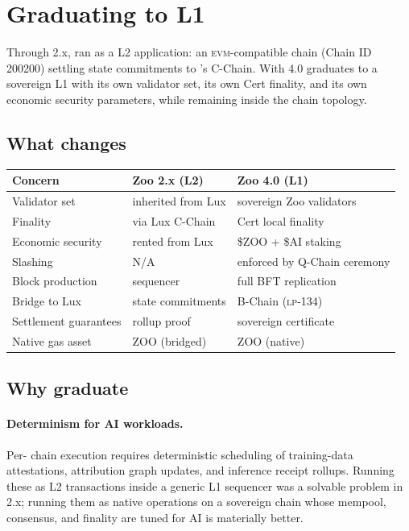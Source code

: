 \section{Graduating to L1}
\label{sec:l1-graduation}

Through 2.x, \Zoo{} ran as a \Lux{} L2 application: an \textsc{evm}-compatible
chain (Chain ID 200200) settling state commitments to \Lux{}'s C-Chain. With
4.0 \Zoo{} graduates to a sovereign L1 with its own validator set, its own
\Quasar{}Cert finality, and its own economic security parameters, while
remaining inside the \Lux{} chain topology.

\subsection{What changes}

\begin{longtable}{p{}p{}p{}}
\toprule
\textbf{Concern} & \textbf{Zoo 2.x (L2)} & \textbf{Zoo 4.0 (L1)} \\
\midrule
Validator set & inherited from Lux & sovereign Zoo validators \\
Finality & via Lux C-Chain & \Quasar{}Cert local finality \\
Economic security & rented from Lux & \$ZOO + \$AI staking \\
Slashing & N/A & enforced by Q-Chain ceremony \\
Block production & sequencer & full BFT replication \\
Bridge to Lux & state commitments & B-Chain (\textsc{lp-134}) \\
Settlement guarantees & rollup proof & sovereign certificate \\
Native gas asset & ZOO (bridged) & ZOO (native) \\
\bottomrule
\end{longtable}

\subsection{Why graduate}

\paragraph{Determinism for AI workloads.} Per-\LLM{} chain execution
\cite{zoo-per-llm-chains} requires deterministic scheduling of training-data
attestations, attribution graph updates, and inference receipt rollups.
Running these as L2 transactions inside a generic L1 sequencer was a
solvable problem in 2.x; running them as native operations on a sovereign
chain whose mempool, consensus, and finality are tuned for AI is materially
better.

